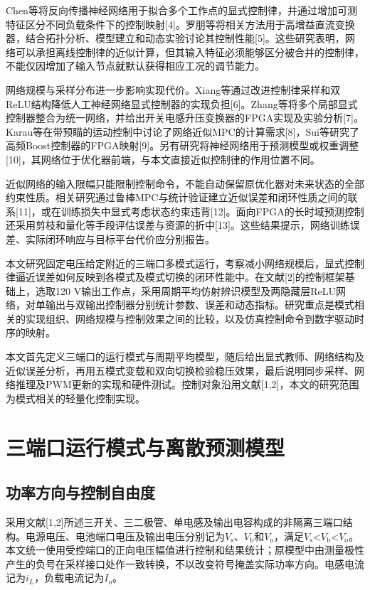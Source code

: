 \documentclass[UTF8,fontset=fandol,a4paper,twocolumn,10pt]{ctexart}
\begin{document}
Chen等将反向传播神经网络用于拟合多个工作点的显式控制律，并通过增加可测特征区分不同负载条件下的控制映射[4]。罗朋等将相关方法用于高增益直流变换器，结合拓扑分析、模型建立和动态实验讨论其控制性能[5]。这些研究表明，网络可以承担离线控制律的近似计算，但其输入特征必须能够区分被合并的控制律，不能仅因增加了输入节点就默认获得相应工况的调节能力。

网络规模与采样分布进一步影响实现代价。Xiang等通过改进控制律采样和双ReLU结构降低人工神经网络显式控制器的实现负担[6]。Zhang等将多个局部显式控制器整合为统一网络，并给出开关电感升压变换器的FPGA实现及实验分析[7]。Karau等在带预瞄的运动控制中讨论了网络近似MPC的计算需求[8]，Sui等研究了高频Boost控制器的FPGA映射[9]。另有研究将神经网络用于预测模型或权重调整[10]，其网络位于优化器前端，与本文直接近似控制律的作用位置不同。

近似网络的输入限幅只能限制控制命令，不能自动保留原优化器对未来状态的全部约束性质。相关研究通过鲁棒MPC与统计验证建立近似误差和闭环性质之间的联系[11]，或在训练损失中显式考虑状态约束违背[12]。面向FPGA的长时域预测控制还采用剪枝和量化等手段评估误差与资源的折中[13]。这些结果提示，网络训练误差、实际闭环响应与目标平台代价应分别报告。

本文研究固定电压给定附近的三端口多模式运行，考察减小网络规模后，显式控制律逼近误差如何反映到各模式及模式切换的闭环性能中。在文献[2]的控制框架基础上，选取120 V输出工作点，采用周期平均仿射辨识模型及两隐藏层ReLU网络，对单输出与双输出控制器分别统计参数、误差和动态指标。研究重点是模式相关的实现组织、网络规模与控制效果之间的比较，以及仿真控制命令到数字驱动时序的映射。

本文首先定义三端口的运行模式与周期平均模型，随后给出显式教师、网络结构及近似误差分析，再用五模式变载和双向切换检验稳压效果，最后说明同步采样、网络推理及PWM更新的实现和硬件测试。控制对象沿用文献[1,2]，本文的研究范围为模式相关的轻量化控制实现。


\section{三端口运行模式与离散预测模型}


\subsection{功率方向与控制自由度}

采用文献[1,2]所述三开关、三二极管、单电感及输出电容构成的非隔离三端口结构。电源电压、电池端口电压及输出电压分别记为$V_{\mathrm s}$、$V_{\mathrm b}$和$V_{\mathrm o}$，满足$V_{\mathrm s}$<$V_{\mathrm b}$<$V_{\mathrm o}$。本文统一使用受控端口的正向电压幅值进行控制和结果统计；原模型中由测量极性产生的负号在采样接口处作一致转换，不以改变符号掩盖实际功率方向。电感电流记为$i_L$，负载电流记为$I_o$。
\end{document}
